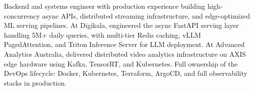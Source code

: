 \small{Backend and systems engineer with production experience building high-concurrency async APIs, distributed streaming infrastructure, and edge-optimized ML serving pipelines. At Digikala, engineered the async FastAPI serving layer handling 5M+ daily queries, with multi-tier Redis caching, vLLM PagedAttention, and Triton Inference Server for LLM deployment. At Advanced Analytics Australia, delivered distributed video analytics infrastructure on AXIS edge hardware using Kafka, TensorRT, and Kubernetes. Full ownership of the DevOps lifecycle: Docker, Kubernetes, Terraform, ArgoCD, and full observability stacks in production.}\vspace{4pt}
